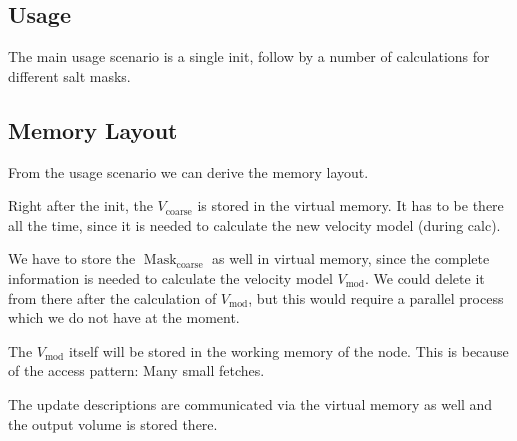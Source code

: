 \documentclass[12pt,a4paper]{article}
\DeclareMathOperator{\mask}{Mask}
\DeclareMathOperator{\coarse}{coarse}
\DeclareMathOperator{\vmod}{mod}
\newcommand{\fieldcoarse}{V_{\coarse}}
\newcommand{\velmodel}{V_{\vmod}}
\newcommand{\maskcoarse}{\mask_{\coarse}}
\begin{document}
\subsection*{Usage}

The main usage scenario is a single init, follow by a number of
calculations for different salt masks.

\begin{center}
\end{center}

\subsection*{Memory Layout}

From the usage scenario we can derive the memory layout.

Right after the init, the $\fieldcoarse$ is stored in the virtual
memory. It has to be there all the time, since it is needed to
calculate the new velocity model (during calc).

We have to store the $\maskcoarse$ as well in virtual memory, since
the complete information is needed to calculate the velocity model
$\velmodel$. We could delete it from there after the calculation of
$\velmodel$, but this would require a parallel process which we do not
have at the moment.

The $\velmodel$ itself will be stored in the working memory of the
node. This is because of the access pattern: Many small fetches.

The update descriptions are communicated via the virtual memory as
well and the output volume is stored there.
\end{document}
